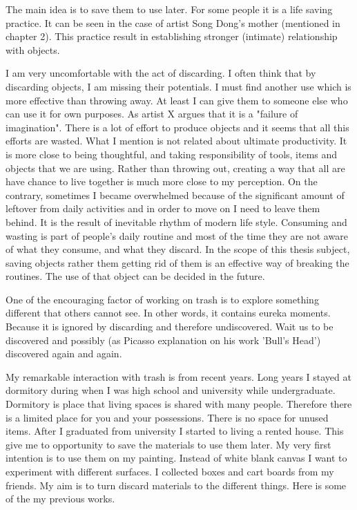 The main idea is to save them to use later. For some people it is a life saving practice. It can be seen in the case of artist Song Dong's mother (mentioned in chapter 2). This practice result in establishing stronger (intimate) relationship with objects. 



I am very uncomfortable with the act of discarding. I often think that by discarding objects, I am missing their potentials. I must find another use which is more effective than throwing away. At least I can give them to someone else who can use it for own purposes. As artist X argues that it is a "failure of imagination". There is a lot of effort to produce objects and it seems that all this efforts are wasted. What I mention is not related about ultimate productivity. It is more close to being thoughtful, and taking responsibility of tools, items and objects that we are using. Rather than throwing out, creating a way that all are have chance to live together is much more close to my perception. On the contrary, sometimes I became overwhelmed because of the significant amount of leftover from daily activities and in order to move on I need to leave them behind. It is the result of inevitable rhythm of modern life style. Consuming and wasting is part of people's daily routine and most of the time they are not aware of what they consume, and what they discard. In the scope of this thesis subject, saving objects rather them getting rid of them is an effective way of breaking the routines. The use of that object can be decided in the future. 

One of the encouraging factor of working on trash is to explore something different that others cannot see. In other words, it contains eureka moments. Because it is ignored by discarding and therefore undiscovered. Wait us to be discovered and possibly (as Picasso explanation on his work 'Bull's Head') discovered again and again. 

My remarkable interaction with trash is from recent years. Long years I stayed at dormitory during when I was high school and university while undergraduate. Dormitory is place that living spaces is shared with many people. Therefore there is a limited place for you and your possessions. There is no space for unused items. After I graduated from university I started to living a rented house. This give me to opportunity to save the materials to use them later. My very first intention is to use them on my painting. Instead of white blank canvas I want to experiment with different surfaces. I collected boxes and cart boards from my friends. My aim is to turn discard materials to the different things. Here is some of the my previous works.

